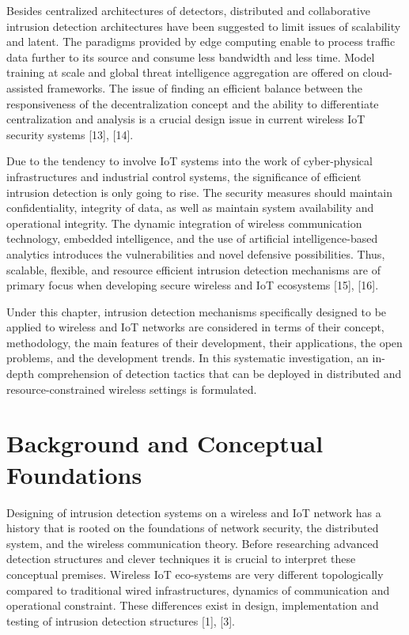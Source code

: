 \documentclass[12pt]{article}
\begin{document}
Besides centralized architectures of detectors, distributed and collaborative intrusion detection architectures have been suggested to limit issues of scalability and latent. The paradigms provided by edge computing enable to process traffic data further to its source and consume less bandwidth and less time. Model training at scale and global threat intelligence aggregation are offered on cloud-assisted frameworks. The issue of finding an efficient balance between the responsiveness of the decentralization concept and the ability to differentiate centralization and analysis is a crucial design issue in current wireless IoT security systems [13], [14].



Due to the tendency to involve IoT systems into the work of cyber-physical infrastructures and industrial control systems, the significance of efficient intrusion detection is only going to rise. The security measures should maintain confidentiality, integrity of data, as well as maintain system availability and operational integrity. The dynamic integration of wireless communication technology, embedded intelligence, and the use of artificial intelligence-based analytics introduces the vulnerabilities and novel defensive possibilities. Thus, scalable, flexible, and resource efficient intrusion detection mechanisms are of primary focus when developing secure wireless and IoT ecosystems [15], [16].



Under this chapter, intrusion detection mechanisms specifically designed to be applied to wireless and IoT networks are considered in terms of their concept, methodology, the main features of their development, their applications, the open problems, and the development trends. In this systematic investigation, an in-depth comprehension of detection tactics that can be deployed in distributed and resource-constrained wireless settings is formulated.
	

	\section{Background and Conceptual Foundations}
	Designing of intrusion detection systems on a wireless and IoT network has a history that is rooted on the foundations of network security, the distributed system, and the wireless communication theory. Before researching advanced detection structures and clever techniques it is crucial to interpret these conceptual premises. Wireless IoT eco-systems are very different topologically compared to traditional wired infrastructures, dynamics of communication and operational constraint. These differences exist in design, implementation and testing of intrusion detection structures [1], [3].
\end{document}
